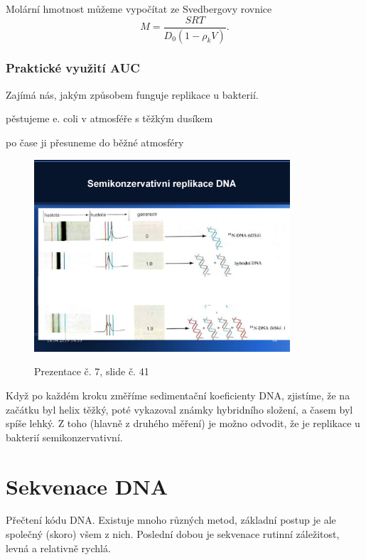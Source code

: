 \documentclass[DIV=8]{scrreprt}
\begin{document}
Molární hmotnost můžeme vypočítat ze Svedbergovy rovnice
\[M = \frac{S R T}{D_0 (1 - \rho_k V)}.\]

\subsection{Praktické využití AUC} \label{Praktické využití AUC}


Zajímá nás, jakým způsobem funguje replikace u bakterií.

\begin{myEnumerate}[nosep]
    \item pěstujeme e. coli v atmosféře s těžkým dusíkem
    \item po čase ji přesuneme do běžné atmosféry
\end{myEnumerate}



\begin{figure}
    \caption{Prezentace č. 7, slide č. 41}
    \includegraphics[width=0.85\textwidth]{slides-7/slide-41.jpg}
    \centering
    \label{slides-7-slide-41}
\end{figure}

Když po každém kroku změříme sedimentační koeficienty DNA, zjistíme, že na začátku byl helix těžký, poté vykazoval známky hybridního složení, a časem byl spíše lehký. Z toho (hlavně z druhého měření) je možno odvodit, že je replikace u bakterií semikonzervativní.

\chapter{Sekvenace DNA} \label{Sekvenace DNA}


Přečtení kódu DNA. Existuje mnoho různých metod, základní postup je ale společný (skoro) všem z nich. Poslední dobou je sekvenace rutinní záležitost, levná a relativně rychlá.
\end{document}
